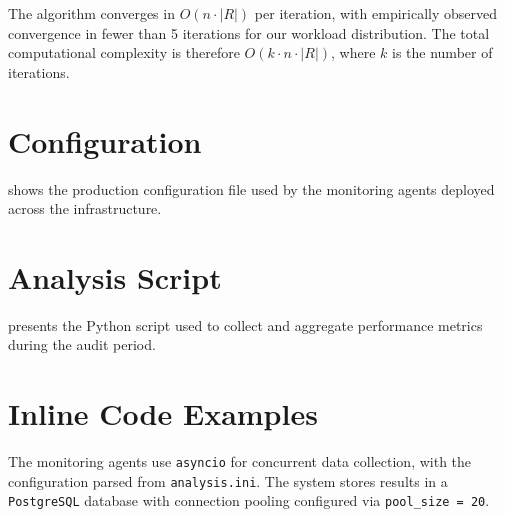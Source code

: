 \documentclass[
    language=english,
    doctype=technical-report,
    institution=none,
    titlestyle=book,
    oneside,
    loadGlossaries,
]{../../omnilatex}
\begin{document}
The algorithm converges in $O(n \cdot |R|)$ per iteration, with
empirically observed convergence in fewer than 5 iterations for our
workload distribution. The total computational complexity is therefore
$O(k \cdot n \cdot |R|)$, where $k$ is the number of iterations.

\section{Configuration}

 shows the production configuration file used by the
monitoring agents deployed across the infrastructure.


\section{Analysis Script}

 presents the Python script used to collect and
aggregate performance metrics during the audit period.


\section{Inline Code Examples}

The monitoring agents use \texttt{asyncio} for concurrent
data collection, with the configuration parsed from
\texttt{analysis.ini}. The system stores results in a
\texttt{PostgreSQL} database with connection pooling configured
via \texttt{pool_size = 20}.
\end{document}
